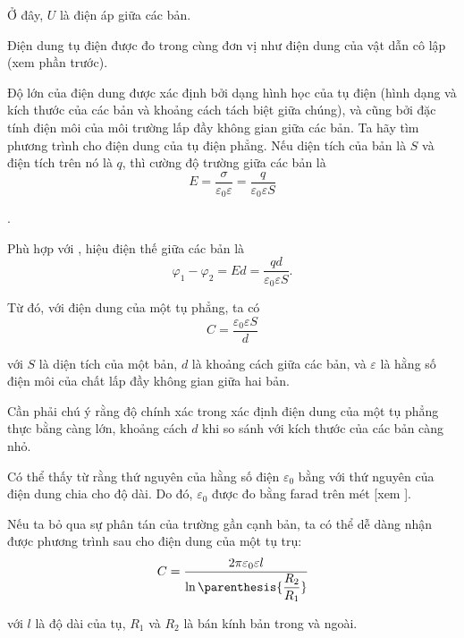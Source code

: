 \noindent
Ở đây, $U$ là điện áp giữa các bản.

Điện dung tụ điện được đo trong cùng đơn vị như điện dung của vật dẫn cô lập (xem phần trước).

Độ lớn của điện dung được xác định bởi dạng hình học của tụ điện (hình dạng và kích thước của các bản và khoảng cách tách biệt giữa chúng), và cũng bởi đặc tính điện môi của môi trường lấp đầy không gian giữa các bản. Ta hãy tìm phương trình cho điện dung của tụ điện phẳng. Nếu diện tích của bản là $S$ và điện tích trên nó là $q$, thì cường độ trường giữa các bản là
\begin{equation*}
    E = \frac{\sigma}{\varepsilon_0 \varepsilon} = \frac{q}{\varepsilon_0 \varepsilon S}
\end{equation*}

.

Phù hợp với , hiệu điện thế giữa các bản là
\begin{equation*}
    \varphi_1 - \varphi_2 = E d = \frac{q d}{\varepsilon_0 \varepsilon S}.
\end{equation*}

\noindent
Từ đó, với điện dung của một tụ phẳng, ta có
\begin{equation}\label{eq:3_12}
    C = \frac{\varepsilon_0 \varepsilon S}{d}
\end{equation}

\noindent
với $S$ là diện tích của một bản, $d$ là khoảng cách giữa các bản, và $\varepsilon$ là hằng số điện môi của chất lấp đầy không gian giữa hai bản.

Cần phải chú ý rằng độ chính xác trong xác định điện dung của một tụ phẳng thực bằng  càng lớn, khoảng cách $d$ khi so sánh với kích thước của các bản càng nhỏ.

Có thể thấy từ  rằng thứ nguyên của hằng số điện $\varepsilon_0$ bằng với thứ nguyên của điện dung chia cho độ dài. Do đó, $\varepsilon_0$ được đo bằng farad trên mét [xem ].

Nếu ta bỏ qua sự phân tán của trường gần cạnh bản, ta có thể dễ dàng nhận được phương trình sau cho điện dung của một tụ trụ:
\begin{equation}\label{eq:3_13}
    C = \frac{2\pi\varepsilon_0\varepsilon l}{\ln\parenthesis{\dfrac{R_2}{R_1}}}
\end{equation}

\noindent
với $l$ là độ dài của tụ, $R_1$ và $R_2$ là bán kính bản trong và ngoài.

